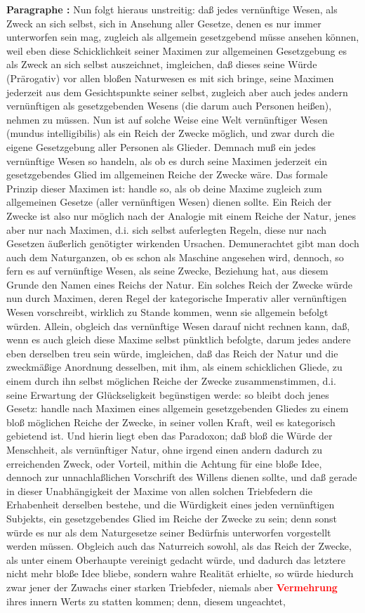 \documentclass[a4paper,12pt,twoside]{book}
\newcommand{\match}[1]{\textcolor{red}{\textbf{#1}}}
\begin{document}
	\textbf{Paragraphe : }Nun folgt hieraus unstreitig: daß jedes vernünftige Wesen, als Zweck an sich selbst, sich in Ansehung aller Gesetze, denen es nur immer unterworfen sein mag, zugleich als allgemein gesetzgebend müsse ansehen können, weil eben diese Schicklichkeit seiner Maximen zur allgemeinen Gesetzgebung es als Zweck an sich selbst auszeichnet, imgleichen, daß dieses seine Würde (Prärogativ) vor allen bloßen Naturwesen es mit sich bringe, seine Maximen jederzeit aus dem Gesichtspunkte seiner selbst, zugleich aber auch jedes andern vernünftigen als gesetzgebenden Wesens (die darum auch Personen heißen), nehmen zu müssen. Nun ist auf solche Weise eine Welt vernünftiger Wesen (mundus intelligibilis) als ein Reich der Zwecke möglich, und zwar durch die eigene Gesetzgebung aller Personen als Glieder. Demnach muß ein jedes vernünftige Wesen so handeln, als ob es durch seine Maximen jederzeit ein gesetzgebendes Glied im allgemeinen Reiche der Zwecke wäre. Das formale Prinzip dieser Maximen ist: handle so, als ob deine Maxime zugleich zum allgemeinen Gesetze (aller vernünftigen Wesen) dienen sollte. Ein Reich der Zwecke ist also nur möglich nach der Analogie mit einem Reiche der Natur, jenes aber nur nach Maximen, d.i. sich selbst auferlegten Regeln, diese nur nach Gesetzen äußerlich genötigter wirkenden Ursachen. Demunerachtet gibt man doch auch dem Naturganzen, ob es schon als Maschine angesehen wird, dennoch, so fern es auf vernünftige Wesen, als seine Zwecke, Beziehung hat, aus diesem Grunde den Namen eines Reichs der Natur. Ein solches Reich der Zwecke würde nun durch Maximen, deren Regel der kategorische Imperativ aller vernünftigen Wesen vorschreibt, wirklich zu Stande kommen, wenn sie allgemein befolgt würden. Allein, obgleich das vernünftige Wesen darauf nicht rechnen kann, daß, wenn es auch gleich  diese Maxime selbst pünktlich befolgte, darum jedes andere eben derselben treu sein würde, imgleichen, daß das Reich der Natur und die zweckmäßige Anordnung desselben, mit ihm, als einem schicklichen Gliede, zu einem durch ihn selbst möglichen Reiche der Zwecke zusammenstimmen, d.i. seine Erwartung der Glückseligkeit begünstigen werde: so bleibt doch jenes Gesetz: handle nach Maximen eines allgemein gesetzgebenden Gliedes zu einem bloß möglichen Reiche der Zwecke, in seiner vollen Kraft, weil es kategorisch gebietend ist. Und hierin liegt eben das Paradoxon; daß bloß die Würde der Menschheit, als vernünftiger Natur, ohne irgend einen andern dadurch zu erreichenden Zweck, oder Vorteil, mithin die Achtung für eine bloße Idee, dennoch zur unnachlaßlichen Vorschrift des Willens dienen sollte, und daß gerade in dieser Unabhängigkeit der Maxime von allen solchen Triebfedern die Erhabenheit derselben bestehe, und die Würdigkeit eines jeden vernünftigen Subjekts, ein gesetzgebendes Glied im Reiche der Zwecke zu sein; denn sonst würde es nur als dem Naturgesetze seiner Bedürfnis unterworfen vorgestellt werden müssen. Obgleich auch das Naturreich sowohl, als das Reich der Zwecke, als unter einem Oberhaupte vereinigt gedacht würde, und dadurch das letztere nicht mehr bloße Idee bliebe, sondern wahre Realität erhielte, so würde hiedurch zwar jener der Zuwachs einer starken Triebfeder, niemals aber \match{Vermehrung} ihres innern Werts zu statten kommen; denn, diesem ungeachtet, 
\end{document}
